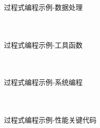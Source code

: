 \documentclass[UTF8,aspectratio=169]{beamer}
\begin{document}
\begin{frame}[fragile]{过程式编程示例-数据处理}
    \begin{columns}
        \begin{column}{0.48\textwidth}
            \inputminted[firstline=1,lastline=17]{cpp}{code/process_example_data.cpp}
        \end{column}
        \begin{column}{0.48\textwidth}
            \inputminted[firstline=18,lastline=36]{cpp}{code/process_example_data.cpp}
        \end{column}
    \end{columns}
\end{frame}

\begin{frame}[fragile]{过程式编程示例-工具函数}
    \begin{columns}
        \begin{column}{0.48\textwidth}
            \inputminted[firstline=1,lastline=16]{cpp}{code/process_example_tool_function.cpp}
        \end{column}
        \begin{column}{0.48\textwidth}
            \inputminted[firstline=17,lastline=36]{cpp}{code/process_example_tool_function.cpp}
        \end{column}
    \end{columns}
\end{frame}

\begin{frame}[fragile]{过程式编程示例-系统编程}
    \begin{columns}
        \begin{column}{0.48\textwidth}
            \inputminted[firstline=1,lastline=17]{cpp}{code/process_example_system_function.cpp}
        \end{column}
        \begin{column}{0.48\textwidth}
            \inputminted[firstline=18,lastline=34]{cpp}{code/process_example_system_function.cpp}
        \end{column}
    \end{columns}
\end{frame}

\begin{frame}[fragile]{过程式编程示例-性能关键代码}
    \begin{columns}
        \begin{column}{0.48\textwidth}
            \inputminted[firstline=1,lastline=18]{cpp}{code/process_example_performance_critical.cpp}
        \end{column}
        \begin{column}{0.48\textwidth}
            \inputminted[firstline=19,lastline=36]{cpp}{code/process_example_performance_critical.cpp}
        \end{column}
    \end{columns}
\end{frame}
\end{document}
